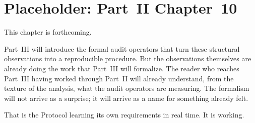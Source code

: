 \chapter{Placeholder: Part~II Chapter~10}
\label{ch:p2c10}
This chapter is forthcoming.

Part~III will introduce the formal audit operators that
turn these structural observations into a reproducible
procedure. But the observations themselves are already
doing the work that Part~III will formalize. The reader
who reaches Part~III having worked through Part~II will
already understand, from the texture of the analysis,
what the audit operators are measuring. The formalism
will not arrive as a surprise; it will arrive as a name
for something already felt.

That is the \Ortyx{} Protocol learning its own requirements
in real time. It is working.
